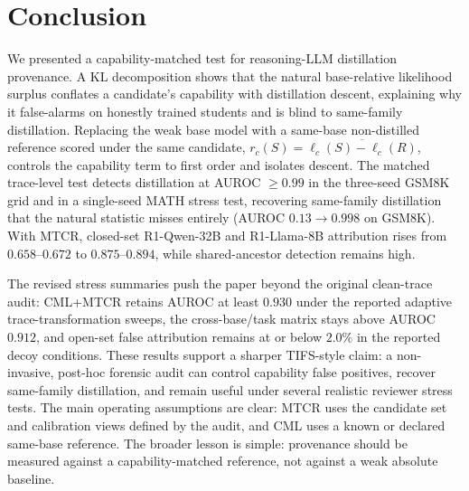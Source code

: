 \documentclass[journal]{IEEEtran}
\begin{document}
\section{Conclusion}
\label{sec:conclusion}
We presented a capability-matched test for reasoning-LLM distillation provenance. A
KL decomposition shows that the natural base-relative likelihood surplus conflates a
candidate's capability with distillation descent, explaining why it false-alarms on
honestly trained students and is blind to same-family distillation. Replacing the
weak base model with a same-base non-distilled reference scored under the same
candidate, $r_c(S)=\overline{\ell_c(S)-\ell_c(R)}$, controls the capability term to
first order and isolates descent. The matched trace-level test detects distillation
at AUROC $\geq0.99$ in the three-seed GSM8K grid and in a single-seed MATH stress
test, recovering same-family distillation that the natural statistic misses
entirely (AUROC $0.13\!\to\!0.998$ on GSM8K). With MTCR, closed-set R1-Qwen-32B and
R1-Llama-8B attribution rises from $0.658$--$0.672$ to $0.875$--$0.894$, while
shared-ancestor detection remains high.

The revised stress summaries push the paper beyond the original clean-trace audit:
CML+MTCR retains AUROC at least $0.930$ under the reported adaptive
trace-transformation sweeps, the cross-base/task matrix stays above AUROC $0.912$,
and open-set false attribution remains at or below $2.0\%$ in the reported decoy
conditions. These results support a sharper TIFS-style claim: a non-invasive,
post-hoc forensic audit can control capability false positives, recover same-family
distillation, and remain useful under several realistic reviewer stress tests. The
main operating assumptions are clear: MTCR uses the candidate set and calibration
views defined by the audit, and CML uses a known or declared same-base reference.
The broader lesson is simple: provenance should be
measured against a capability-matched reference, not against a weak absolute
baseline.



\begingroup
\footnotesize

\endgroup
\end{document}
